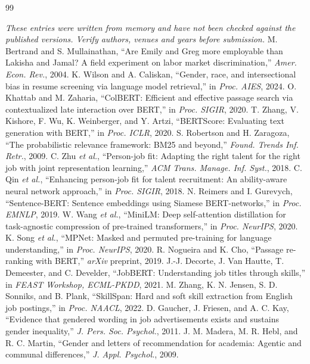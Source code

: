 \documentclass[conference,a4paper]{IEEEtran}
\begin{document}
\balance
\begin{thebibliography}{99}
\item[] \emph{These entries were written from memory and have not been checked against the published versions. Verify authors, venues and years before submission.}
 M. Bertrand and S. Mullainathan, ``Are Emily and Greg more employable than Lakisha and Jamal? A field experiment on labor market discrimination,'' \emph{Amer. Econ. Rev.}, 2004.
 K. Wilson and A. Caliskan, ``Gender, race, and intersectional bias in resume screening via language model retrieval,'' in \emph{Proc. AIES}, 2024.
 O. Khattab and M. Zaharia, ``ColBERT: Efficient and effective passage search via contextualized late interaction over BERT,'' in \emph{Proc. SIGIR}, 2020.
 T. Zhang, V. Kishore, F. Wu, K. Weinberger, and Y. Artzi, ``BERTScore: Evaluating text generation with BERT,'' in \emph{Proc. ICLR}, 2020.
 S. Robertson and H. Zaragoza, ``The probabilistic relevance framework: BM25 and beyond,'' \emph{Found. Trends Inf. Retr.}, 2009.
 C. Zhu \emph{et al.}, ``Person-job fit: Adapting the right talent for the right job with joint representation learning,'' \emph{ACM Trans. Manage. Inf. Syst.}, 2018.
 C. Qin \emph{et al.}, ``Enhancing person-job fit for talent recruitment: An ability-aware neural network approach,'' in \emph{Proc. SIGIR}, 2018.
 N. Reimers and I. Gurevych, ``Sentence-BERT: Sentence embeddings using Siamese BERT-networks,'' in \emph{Proc. EMNLP}, 2019.
 W. Wang \emph{et al.}, ``MiniLM: Deep self-attention distillation for task-agnostic compression of pre-trained transformers,'' in \emph{Proc. NeurIPS}, 2020.
 K. Song \emph{et al.}, ``MPNet: Masked and permuted pre-training for language understanding,'' in \emph{Proc. NeurIPS}, 2020.
 R. Nogueira and K. Cho, ``Passage re-ranking with BERT,'' \emph{arXiv} preprint, 2019.
 J.-J. Decorte, J. Van Hautte, T. Demeester, and C. Develder, ``JobBERT: Understanding job titles through skills,'' in \emph{FEAST Workshop, ECML-PKDD}, 2021.
 M. Zhang, K. N. Jensen, S. D. Sonniks, and B. Plank, ``SkillSpan: Hard and soft skill extraction from English job postings,'' in \emph{Proc. NAACL}, 2022.
 D. Gaucher, J. Friesen, and A. C. Kay, ``Evidence that gendered wording in job advertisements exists and sustains gender inequality,'' \emph{J. Pers. Soc. Psychol.}, 2011.
 J. M. Madera, M. R. Hebl, and R. C. Martin, ``Gender and letters of recommendation for academia: Agentic and communal differences,'' \emph{J. Appl. Psychol.}, 2009.

\end{thebibliography}
\end{document}
